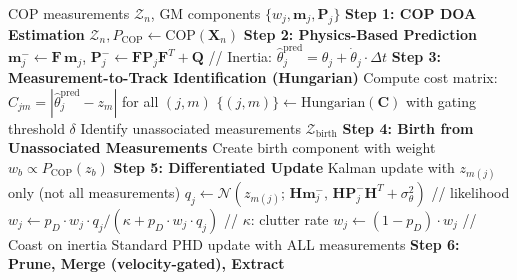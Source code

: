 \documentclass[journal]{IEEEtran}
\newcommand{\mat}[1]{\mathbf{#1}}
\begin{document}
\begin{algorithm}[t]
\caption{Physics-Based GM-PHD: Predict--Identify--Update}
\label{alg:phd_physics}
\begin{algorithmic}[1]
\REQUIRE COP measurements $\mathcal{Z}_n$, GM components $\{w_j, \mat{m}_j, \mat{P}_j\}$
\STATE \textbf{Step 1: COP DOA Estimation}
\STATE $\mathcal{Z}_n, P_{\mathrm{COP}} \leftarrow \mathrm{COP}(\mat{X}_n)$
\STATE \textbf{Step 2: Physics-Based Prediction}
    \STATE $\mat{m}_{j}^{-} \leftarrow \mat{F}\,\mat{m}_j$, \quad $\mat{P}_j^{-} \leftarrow \mat{F}\mat{P}_j\mat{F}^T + \mat{Q}$
    \STATE // Inertia: $\hat{\theta}_j^{\mathrm{pred}} = \theta_j + \dot{\theta}_j \cdot \Delta t$
\ENDFOR
\STATE \textbf{Step 3: Measurement-to-Track Identification (Hungarian)}
\STATE Compute cost matrix: $C_{jm} = |\hat{\theta}_j^{\mathrm{pred}} - z_m|$ for all $(j, m)$
\STATE $\{(j, m)\} \leftarrow \mathrm{Hungarian}(\mat{C})$ with gating threshold $\delta$
\STATE Identify unassociated measurements $\mathcal{Z}_{\mathrm{birth}}$
\STATE \textbf{Step 4: Birth from Unassociated Measurements}
    \STATE Create birth component with weight $w_b \propto P_{\mathrm{COP}}(z_b)$
\ENDFOR
\STATE \textbf{Step 5: Differentiated Update}
    \STATE Kalman update with $z_{m(j)}$ only (not all measurements)
    \STATE $q_j \leftarrow \mathcal{N}(z_{m(j)};\, \mat{H}\mat{m}_j^{-},\, \mat{H}\mat{P}_j^{-}\mat{H}^T + \sigma_\theta^2)$ \hfill // likelihood
    \STATE $w_j \leftarrow p_D \cdot w_j \cdot q_j / (\kappa + p_D \cdot w_j \cdot q_j)$ \hfill // $\kappa$: clutter rate
\ENDFOR
{}
    \STATE $w_j \leftarrow (1 - p_D) \cdot w_j$ \quad // Coast on inertia
\ENDFOR
{}
    \STATE Standard PHD update with ALL measurements
\ENDFOR
\STATE \textbf{Step 6: Prune, Merge (velocity-gated), Extract}
\end{algorithmic}
\end{algorithm}
\end{document}
